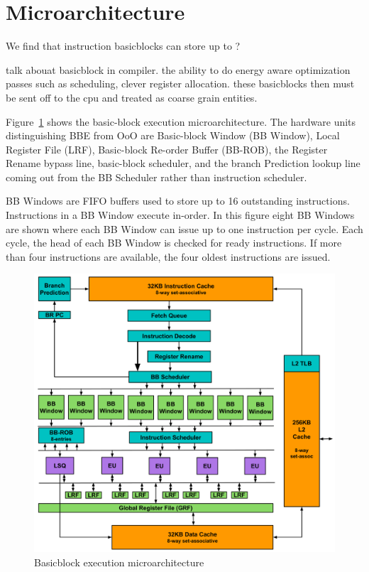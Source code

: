 \section{Microarchitecture}
\label{sec:arch}


We find that instruction basicblocks can store up to ?


talk abouat basicblock in compiler. the ability to do energy aware optimization
passes such as scheduling, clever register allocation. these basicblocks then
must be sent off to the cpu and treated as coarse grain entities.

Figure~\ref{fig:bb_arch} shows the basic-block execution microarchitecture. The
hardware units distinguishing BBE from OoO are Basic-block Window (BB Window),
         Local Register File (LRF), Basic-block Re-order Buffer (BB-ROB), the
         Register Rename bypass line, basic-block scheduler, and the branch
         Prediction lookup line coming out from the BB Scheduler rather than
         instruction scheduler. 

BB Windows are FIFO buffers used to store up to 16 outstanding instructions.
Instructions in a BB Window execute in-order. In this figure eight BB Windows
are shown where each BB Window can issue up to one instruction per cycle. Each
cycle, the head of each BB Window is checked for ready instructions. If more
than four instructions are available, the four oldest instructions are issued.


\begin{figure}
	\centering
	\includegraphics[width=1.0\columnwidth]{fig/bb_architecture.pdf} 
	\caption{Basicblock execution microarchitecture}
	\label{fig:bb_arch}
\end{figure}


